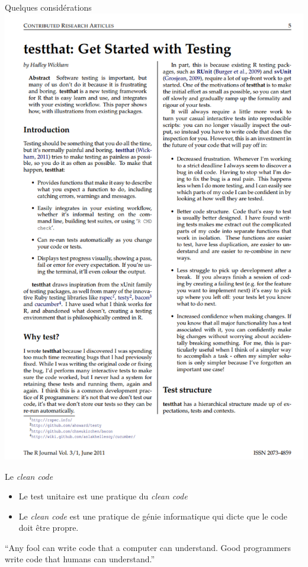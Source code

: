 \documentclass[11pt]{beamer}
\begin{document}
\begin{frame}{Quelques considérations}
\includegraphics[height=0.25\textheight]{testthat}

\end{frame}

\begin{frame}{Le \textit{clean code}}
\begin{itemize}
    \item Le test unitaire est une pratique du \textit{clean code}
    \item Le \textit{clean code} est une pratique de génie informatique qui dicte que le code doit être propre.
\end{itemize}
\begin{block}{}
{\large ``Any fool can write code that a computer can understand. Good programmers
write code that humans can understand.''}
\vskip5mm
\hspace*{}
\end{block}
\end{frame}
\end{document}
